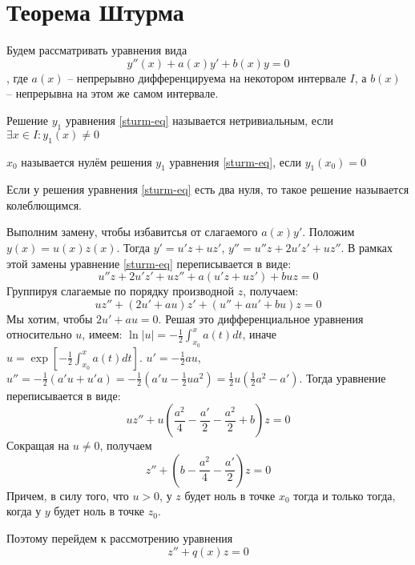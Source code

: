 \documentclass[document.tex]{subfiles}
\begin{document}
\section{Теорема Штурма}
Будем рассматривать уравнения вида
\begin{equation}
    \label{sturm-eq}
    y''(x) + a(x)y' + b(x)y = 0
\end{equation}
, где $a(x)$ -- непрерывно дифференцируема на некотором
интервале $I$, а $b(x)$ -- непрерывна на этом же самом интервале.

\begin{definition}
    Решение $y_1$ уравнения \ref{sturm-eq} называется нетривиальным, если $\exists x \in I: y_1(x) \neq 0$
\end{definition}

\begin{definition}
    $x_0$ называется нулём решения $y_1$ уравнения \ref{sturm-eq}, если $y_1(x_0) = 0$
\end{definition}

\begin{definition}
    Если у решения уравнения \ref{sturm-eq} есть два нуля, то такое решение называется колеблющимся.
\end{definition}

Выполним замену, чтобы избавитсья от слагаемого $a(x)y'$. Положим $y(x) = u(x) z(x)$. Тогда $y' = u'z + uz'$, $y'' =
u''z + 2u'z' + uz''$. В рамках этой замены уравнение \ref{sturm-eq} переписывается в виде:
\[
    u''z + 2u'z' + uz'' + a(u'z + uz') + buz = 0
\]
Группируя слагаемые по порядку производной $z$, получаем:
\[
    uz'' + (2u' + au)z' + (u'' + au' + bu)z = 0
\]
Мы хотим, чтобы $2u' + au = 0$. Решая это дифференциальное уравнения относительно $u$, имеем: $\ln |u| =
-\frac{1}{2}\int_{x_0}^{x}a(t)dt$, иначе $u = \exp \left[ -\frac{1}{2}\int_{x_0}^{x}a(t)dt \right]$. $u' =
-\frac{1}{2} a u$, $u'' = -\frac{1}{2}(a'u + u'a) = -\frac{1}{2}(a'u - \frac{1}{2}u a^2) =
\frac{1}{2}u(\frac{1}{2}a^2 - a')$. Тогда уравнение переписывается в виде:
\[
    uz'' + u(\frac{a^2}{4} - \frac{a'}{2} - \frac{a^2}{2} + b)z = 0
\]
Сокращая на $u \neq 0$, получаем
\[
    z'' + (b - \frac{a^2}{4} - \frac{a'}{2})z = 0
\]
Причем, в силу того, что $u > 0$, у $z$ будет ноль в точке $x_0$ тогда и только тогда, когда у $y$ будет ноль в точке
$z_0$.

Поэтому перейдем к рассмотрению уравнения
\begin{equation}
    \label{sturm}
    z'' + q(x)z = 0
\end{equation}
\end{document}
